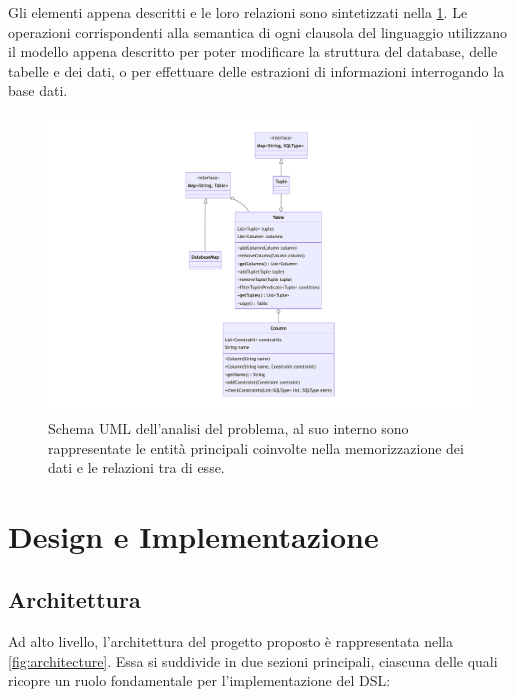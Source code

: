 \documentclass[12pt,a4paper,openright,twoside]{book}
\begin{document}
Gli elementi appena descritti e le loro relazioni sono sintetizzati nella \cref{fig:model-diagram}. Le operazioni corrispondenti alla 
semantica di ogni clausola del linguaggio utilizzano il modello appena descritto per poter modificare la struttura del database, delle 
tabelle e dei dati, o per effettuare delle estrazioni di informazioni interrogando la base dati.

\begin{figure}
    \centering
    \includegraphics[width=.6\linewidth]{figures/model-diagram.pdf}
    \caption{Schema UML dell'analisi del problema, al suo interno sono rappresentate le entità principali coinvolte nella memorizzazione 
            dei dati e le relazioni tra di esse.}
    \label{fig:model-diagram}
\end{figure}

\chapter{Design e Implementazione}
\label{chap:Imple}

\section{Architettura}
Ad alto livello, l’architettura del progetto proposto è rappresentata nella \cref{fig:architecture}. Essa si suddivide in due sezioni 
principali, ciascuna delle quali ricopre un ruolo fondamentale per l’implementazione del \ac{DSL}:
\end{document}
